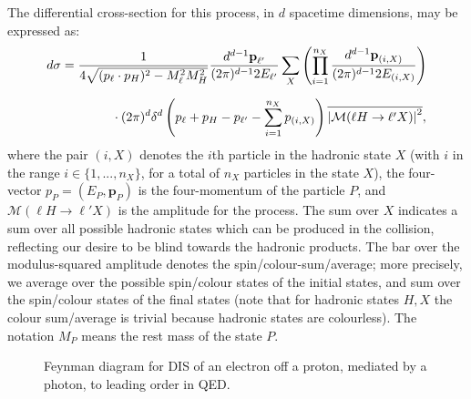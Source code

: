 \documentclass[withindex,glossary]{cam-thesis}
\renewcommand{\vec}[1]{\textbf{#1}} %
\begin{document}
\noindent The differential cross-section for this process, in $d$ spacetime dimensions, may be expressed as:
\begin{align}
\label{eq:diff_xsec_dis}
d\sigma &= \frac{1}{4 \sqrt{(p_{\ell} \cdot p_H)^2 - M_{\ell}^2 M_H^2}} \frac{d^{d-1}\vec{p}_{\ell'}}{(2\pi)^{d-1} 2E_{\ell'}} \sum_{X} \left(\prod_{i=1}^{n_X} \frac{d^{d-1} \vec{p}_{(i,X)}}{(2\pi)^{d-1} 2E_{(i,X)}}\right) \notag \\[1.5ex]
& \qquad\qquad \cdot (2\pi)^d \delta^d\left(p_\ell + p_H - p_{\ell'} - \sum_{i=1}^{n_X} p_{(i,X)}\right) \overline{\left| \mathcal{M}(\ell H \rightarrow \ell' X) \right|^2},
\end{align}
where the pair $(i,X)$ denotes the $i$th particle in the hadronic state $X$ (with $i$ in the range $i \in \{1,...,n_X\}$, for a total of $n_X$ particles in the state $X$), the four-vector $p_{P} = (E_{P}, \vec{p}_{P})$ is the four-momentum of the particle $P$, and $\mathcal{M}(\ell H \rightarrow \ell' X)$ is the amplitude for the process. The sum over $X$ indicates a sum over all possible hadronic states which can be produced in the collision, reflecting our desire to be blind towards the hadronic products. The bar over the modulus-squared amplitude denotes the spin/colour-sum/average; more precisely, we average over the possible spin/colour states of the initial states, and sum over the spin/colour states of the final states (note that for hadronic states $H,X$ the colour sum/average is trivial because hadronic states are colourless). The notation $M_{P}$ means the rest mass of the state $P$.

\begin{figure}[H]
\centering
\caption{Feynman diagram for DIS of an electron off a proton, mediated by a photon, to leading order in QED.}
\label{fig:photondis}
\end{figure}
\end{document}
